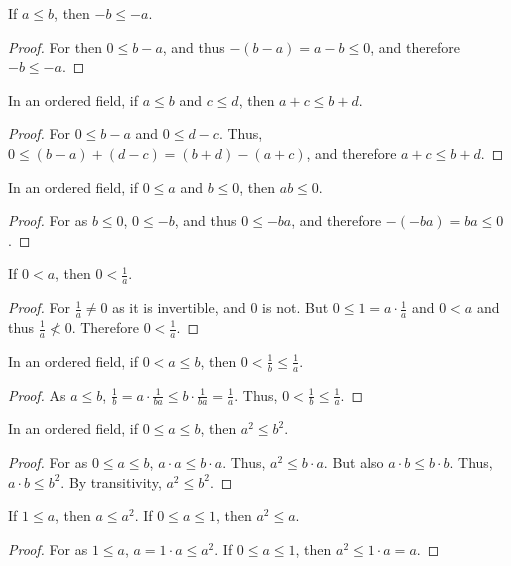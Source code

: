 \documentclass[crop=false,class=book,oneside]{standalone}
\begin{document}
            \begin{corollary}
            If $a\leq b$, then $-b\leq -a$.
            \end{corollary}
            \begin{proof}
            For then $0 \leq b-a$, and thus $-(b-a)=a-b\leq 0$, and therefore $-b \leq -a$.
            \end{proof}
            \begin{theorem}
            In an ordered field, if $a\leq b$ and $c\leq d$, then $a+c \leq b+d$.
            \end{theorem}
            \begin{proof}
            For $0\leq b-a$ and $0\leq d-c$. Thus, $0\leq (b-a)+(d-c)= (b+d)-(a+c)$, and therefore $a+c \leq b+d$.
            \end{proof}
            \begin{theorem}
            In an ordered field, if $0\leq a$ and $b\leq 0$, then $ab\leq 0$.
            \end{theorem}
            \begin{proof}
            For as $b\leq 0$, $0\leq -b$, and thus $0\leq -ba$, and therefore $-(-ba) = ba \leq 0$.
            \end{proof}
            \begin{theorem}
            If $0< a$, then $0<\frac{1}{a}$.
            \end{theorem}
            \begin{proof}
            For $\frac{1}{a}\ne 0$ as it is invertible, and $0$ is not. But $0\leq1=a\cdot \frac{1}{a}$ and $0<a$ and thus $\frac{1}{a} \not <0$. Therefore $0<\frac{1}{a}$.
            \end{proof}
            \begin{theorem}
            In an ordered field, if $0<a\leq b$, then $0<\frac{1}{b}\leq\frac{1}{a}$.
            \end{theorem}
            \begin{proof}
            As $a\leq b$, $\frac{1}{b}=a\cdot \frac{1}{ba} \leq b\cdot \frac{1}{ba}=\frac{1}{a}$. Thus, $0< \frac{1}{b}\leq \frac{1}{a}$.
            \end{proof}
            \begin{theorem}
            In an ordered field, if $0 \leq a \leq b$, then $a^2 \leq b^2$.
            \end{theorem}
            \begin{proof}
            For as $0\leq a \leq b$, $a\cdot a \leq b\cdot a$. Thus, $a^2 \leq b \cdot a$. But also $a\cdot b \leq b\cdot b$. Thus, $a\cdot b \leq b^2$. By transitivity, $a^2 \leq b^2$.
            \end{proof}
            \begin{corollary}
            If $1\leq a$, then $a \leq a^2$. If $0\leq a \leq 1$, then $a^2 \leq a$.
            \end{corollary}
            \begin{proof}
            For as $1\leq a$, $a=1\cdot a \leq a^2$. If $0\leq a \leq 1$, then $a^2 \leq 1\cdot a = a$.
            \end{proof}
\end{document}
